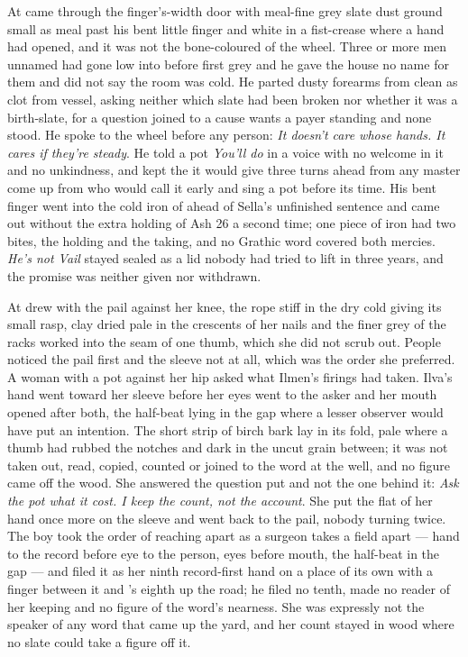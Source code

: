 At   came through the finger's-width door with meal-fine grey slate dust ground small as meal past his bent little finger and white in a fist-crease where a hand had opened, and it was not the bone-coloured  of the wheel. Three or more men unnamed had gone low into  before first grey and he gave the house no name for them and did not say the room was cold. He parted dusty forearms from clean as clot from vessel, asking neither which slate had been broken nor whether it was a birth-slate, for a question joined to a cause wants a payer standing and none stood. He spoke to the wheel before any person: \emph{It doesn't care whose hands. It cares if they're steady}. He told a pot \emph{You'll do} in a voice with no welcome in it and no unkindness, and kept the  it would give three turns ahead from any master come up from  who would call it early and sing a pot before its time. His bent finger went into the cold iron of  ahead of Sella's unfinished sentence and came out without the extra holding of Ash 26 a second time; one piece of iron had two bites, the holding and the taking, and no Grathic word covered both mercies. \emph{He's not Vail} stayed sealed as a lid nobody had tried to lift in three years, and the promise was neither given nor withdrawn.

At   drew with the pail against her knee, the rope stiff in the dry cold giving its small rasp, clay dried pale in the crescents of her nails and the finer grey of the racks worked into the seam of one thumb, which she did not scrub out. People noticed the pail first and the sleeve not at all, which was the order she preferred. A woman with a pot against her hip asked what Ilmen's firings had taken. Ilva's hand went toward her sleeve before her eyes went to the asker and her mouth opened after both, the half-beat lying in the gap where a lesser observer would have put an intention. The short strip of birch bark lay in its fold, pale where a thumb had rubbed the notches and dark in the uncut grain between; it was not taken out, read, copied, counted or joined to the word at the well, and no figure came off the wood. She answered the question put and not the one behind it: \emph{Ask the pot what it cost. I keep the count, not the account}. She put the flat of her hand once more on the sleeve and went back to the pail, nobody turning twice. The boy took the order of reaching apart as a surgeon takes a field apart --- hand to the record before eye to the person, eyes before mouth, the half-beat in the gap --- and filed it as her ninth record-first hand on a place of its own with a finger between it and 's eighth up the road; he filed no tenth, made no reader of her keeping and no figure of the word's nearness. She was expressly not the speaker of any word that came up the yard, and her count stayed in wood where no slate could take a figure off it.

